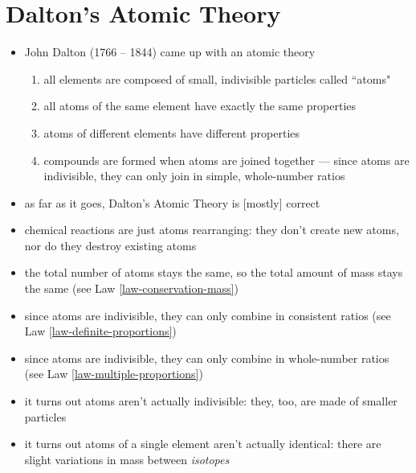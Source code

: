 \documentclass[11pt, oneside]{article}   	%
\begin{document}
\section{Dalton's Atomic Theory}
\begin{itemize}
\item John Dalton (1766 -- 1844) came up with an atomic theory\cite[p. 83--85]{wile-chem-2}
\begin{enumerate}
\item all elements are composed of small, indivisible particles called ``atoms"
\item all atoms of the same element have exactly the same properties
\item atoms of different elements have different properties
\item compounds are formed when atoms are joined together --- since atoms are indivisible, they can only join in simple, whole-number ratios
\end{enumerate}
\item as far as it goes, Dalton's Atomic Theory is [mostly] correct
\item chemical reactions are just atoms rearranging: they don't create new atoms, nor do they destroy existing atoms
\item the total number of atoms stays the same, so the total amount of mass stays the same (see Law \ref{law-conservation-mass})
\item since atoms are indivisible, they can only combine in consistent ratios (see Law \ref{law-definite-proportions})
\item since atoms are indivisible, they can only combine in whole-number ratios (see Law \ref{law-multiple-proportions})
\item it turns out atoms aren't actually indivisible: they, too, are made of smaller particles\cite[p. 85]{wile-chem-2}
\item it turns out atoms of a single element aren't actually identical: there are slight variations in mass between \emph{isotopes}\cite[p. 85]{wile-chem-2}
\end{itemize}



\nocite{wile-chem-2}
{}

\end{document}
